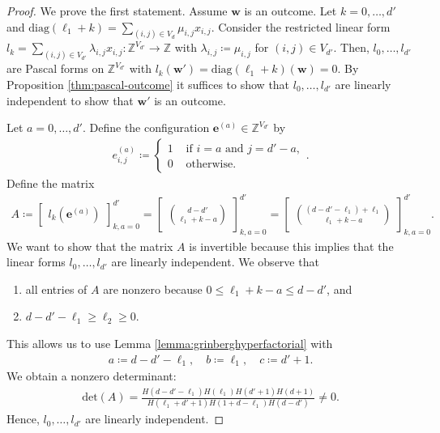 \begin{proof}
    We prove the first statement. Assume \( \mathbf{w} \) is an outcome. Let \( k = 0, \dots, d' \) and \( \mathrm{diag}(\ell_1 + k) = \sum_{(i,j) \in V_d} \mu_{i,j} x_{i,j} \). Consider the restricted linear form \( l_k = \sum_{(i,j) \in V_{d'}} \lambda_{i,j}x_{i,j} : \mathbb{Z}^{V_{d'}} \to \mathbb{Z} \) with \( \lambda_{i,j} \coloneqq \mu_{i,j} \) for \( (i,j) \in V_{d'} \). Then, \( l_0, \dots, l_{d'} \) are Pascal forms on \( \mathbb{Z}^{V_{d'}} \) with \( l_k(\mathbf{w}') = \mathrm{diag}(\ell_1 + k)(\mathbf{w}) = 0 \). By Proposition \ref{thm:pascal-outcome} it suffices to show that \( l_0, \dots, l_{d'} \) are linearly independent to show that \( \mathbf{w}' \) is an outcome.

    Let \( a = 0, \dots, d' \). Define the configuration \( \mathbf{e}^{(a)} \in \mathbb{Z}^{V_{d'}} \) by 
    \begin{align*}
        e_{{i,j}}^{(a)} \coloneqq \begin{cases}
            1 & \text{ if } i = a \text{ and } j = d' - a, \\
            0 & \text{ otherwise}.
        \end{cases}.
    \end{align*}
    Define the matrix 
    \begin{align*}
        A \coloneqq \begin{bmatrix}
            l_k(\mathbf{e}^{(a)})
        \end{bmatrix}^{d'}_{k,a = 0} = \begin{bmatrix}
            \binom{d-d'}{\ell_1 + k - a}
        \end{bmatrix}^{d'}_{k,a = 0} = \begin{bmatrix}
            \binom{(d-d' - \ell_1) + \ell_1}{\ell_1 + k - a}
        \end{bmatrix}^{d'}_{k,a = 0}.
    \end{align*}
    We want to show that the matrix \( A \) is invertible because this implies that the linear forms \( l_0, \dots, l_{d'} \) are linearly independent. We observe that 
    \begin{enumerate}
        \item all entries of \( A \) are nonzero because \( 0 \leq \ell_1 + k - a \leq d - d' \), and 
        \item \( d - d' - \ell_1 \geq \ell_2 \geq 0 \).
    \end{enumerate}
    This allows us to use Lemma \ref{lemma:grinberghyperfactorial} with 
    \begin{align*}
        a \coloneqq d - d' - \ell_1, \quad b \coloneqq \ell_1, \quad c \coloneqq d' + 1.
    \end{align*}
    We obtain a nonzero determinant:
    \begin{align*}
        \mathrm{det}(A) = \frac{H(d - d' - \ell_1)H(\ell_1)H(d' + 1)H(d+1)}{H(\ell_1 + d' + 1)H(1 + d - \ell_1)H(d - d')} \neq 0.
    \end{align*}
    Hence, \( l_0, \dots, l_{d'} \) are linearly independent.


\end{proof}
